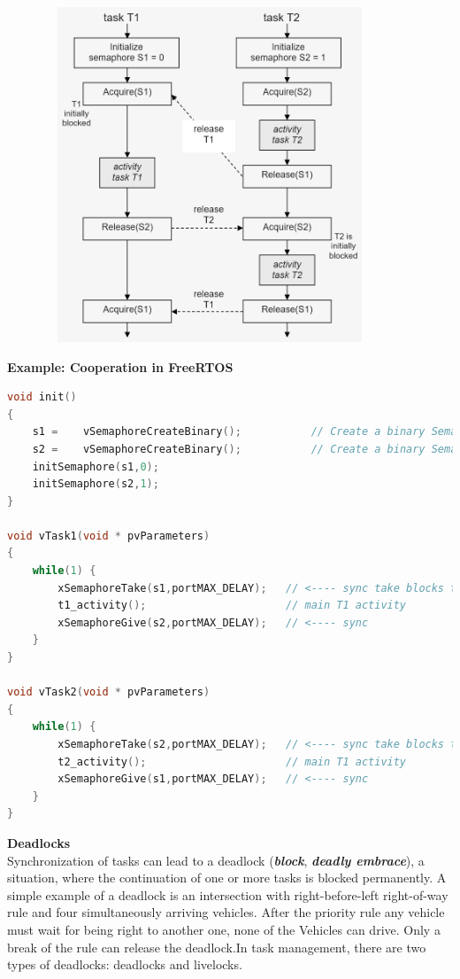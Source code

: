  	\begin{figure}[h]
    \centering
    \includegraphics[width=10cm, height=10cm]{Images/image107.png}
    \label{fig:Fig }
    \end{figure}

\textbf{Example: Cooperation in FreeRTOS  }

\begin{lstlisting}[style=mystyle, language=c]
void init()
{
	s1 =	vSemaphoreCreateBinary();			// Create a binary Semaphore 
	s2 =	vSemaphoreCreateBinary();			// Create a binary Semaphore 
	initSemaphore(s1,0);  	
	initSemaphore(s2,1);
}

void vTask1(void * pvParameters)
{
	while(1) {
		xSemaphoreTake(s1,portMAX_DELAY);	// <---- sync take blocks task !
		t1_activity();						// main T1 activity
		xSemaphoreGive(s2,portMAX_DELAY);	// <---- sync 
 	}
}

void vTask2(void * pvParameters)
{
	while(1) {
		xSemaphoreTake(s2,portMAX_DELAY);	// <---- sync take blocks task !
		t2_activity();						// main T1 activity
		xSemaphoreGive(s1,portMAX_DELAY);	// <---- sync 
 	}
}
\end{lstlisting}

{\rot\bf Deadlocks}\\

Synchronization of tasks can lead to a deadlock (\textbf{\textit{block}}, \textbf{\textit{deadly embrace}}), a situation, where the continuation of one or more tasks is blocked permanently. A simple example of a deadlock is an intersection with right-before-left right-of-way rule and four simultaneously arriving vehicles. After the priority rule any vehicle must wait for being right to another one, none of the Vehicles can drive. Only a break of the rule can release the deadlock.In task management, there are two types of deadlocks: deadlocks and livelocks.\\

